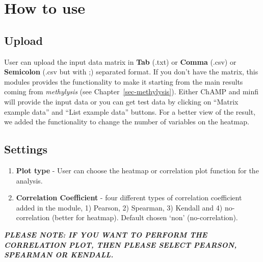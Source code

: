 \documentclass[
  a4paper,
  oneside,
  open=any]{scrreport}
\providecommand{\tightlist}{%
  \setlength{\itemsep}{0pt}\setlength{\parskip}{0pt}}\usepackage{longtable,booktabs,array}
\begin{document}
\hypertarget{how-to-use-4}{%
\section{How to use}\label{how-to-use-4}}

\hypertarget{upload}{%
\subsection{Upload}\label{upload}}

User can upload the input data matrix in \textbf{Tab} (.txt) or
\textbf{Comma} (.csv) or \textbf{Semicolon} (.csv but with ;) separated
format. If you don't have the matrix, this modules provides the
functionality to make it starting from the main results coming from
\emph{methylysis} (see Chapter~\ref{sec-methylysis}). Either ChAMP and
minfi will provide the input data or you can get test data by clicking
on ``Matrix example data'' and ``List example data'' buttons. For a
better view of the result, we added the functionality to change the
number of variables on the heatmap.

\hypertarget{settings}{%
\subsection{Settings}\label{settings}}

\begin{enumerate}
\def\labelenumi{\arabic{enumi}.}
\tightlist
\item
  \textbf{Plot type} - User can choose the heatmap or correlation plot
  function for the analysis.
\item
  \textbf{Correlation Coefficient} - four different types of correlation
  coefficient added in the module, 1) Pearson, 2) Spearman, 3) Kendall
  and 4) no-correlation (better for heatmap). Default chosen `non'
  (no-correlation).
\end{enumerate}

\begin{tcolorbox}[enhanced jigsaw, bottomrule=.15mm, left=2mm, coltitle=black, breakable, colback=white, arc=.35mm, rightrule=.15mm, opacitybacktitle=0.6, toptitle=1mm, leftrule=.75mm, toprule=.15mm, bottomtitle=1mm, opacityback=0, colbacktitle=quarto-callout-important-color!10!white, titlerule=0mm, colframe=quarto-callout-important-color-frame, title=\textcolor{quarto-callout-important-color}{\faExclamation}\hspace{0.5em}{Important}]

\textbf{\emph{PLEASE NOTE: IF YOU WANT TO PERFORM THE CORRELATION PLOT,
THEN PLEASE SELECT PEARSON, SPEARMAN OR KENDALL.}}

\end{tcolorbox}
\end{document}
